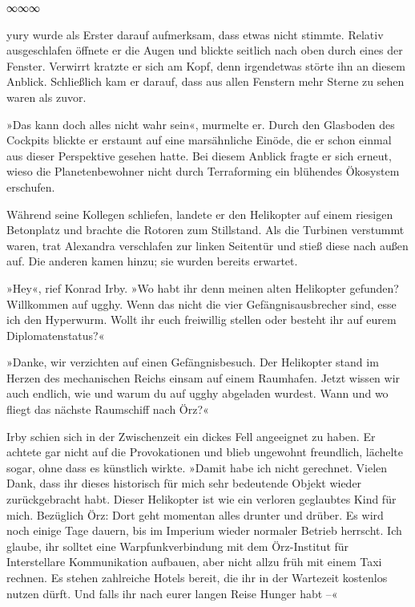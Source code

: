 \begin{center}
∞∞∞
\end{center}

yury wurde als Erster darauf aufmerksam, dass etwas nicht stimmte. Relativ ausgeschlafen öffnete er die Augen und blickte seitlich nach oben durch eines der Fenster. Verwirrt kratzte er sich am Kopf, denn irgendetwas störte ihn an diesem Anblick. Schließlich kam er darauf, dass aus allen Fenstern mehr Sterne zu sehen waren als zuvor.

»Das kann doch alles nicht wahr sein«, murmelte er. Durch den Glasboden des Cockpits blickte er erstaunt auf eine marsähnliche Einöde, die er schon einmal aus dieser Perspektive gesehen hatte. Bei diesem Anblick fragte er sich erneut, wieso die Planetenbewohner nicht durch Terraforming ein blühendes Ökosystem erschufen.

Während seine Kollegen schliefen, landete er den Helikopter auf einem riesigen Betonplatz und brachte die Rotoren zum Stillstand. Als die Turbinen verstummt waren, trat Alexandra verschlafen zur linken Seitentür und stieß diese nach außen auf. Die anderen kamen hinzu; sie wurden bereits erwartet.

»Hey«, rief Konrad Irby. »Wo habt ihr denn meinen alten Helikopter gefunden? Willkommen auf ugghy. Wenn das nicht die vier Gefängnisausbrecher sind, esse ich den Hyperwurm. Wollt ihr euch freiwillig stellen oder besteht ihr auf eurem Diplomatenstatus?«

»Danke, wir verzichten auf einen Gefängnisbesuch. Der Helikopter stand im Herzen des mechanischen Reichs einsam auf einem Raumhafen. Jetzt wissen wir auch endlich, wie und warum du auf ugghy abgeladen wurdest. Wann und wo fliegt das nächste Raumschiff nach Örz?«

Irby schien sich in der Zwischenzeit ein dickes Fell angeeignet zu haben. Er achtete gar nicht auf die Provokationen und blieb ungewohnt freundlich, lächelte sogar, ohne dass es künstlich wirkte. »Damit habe ich nicht gerechnet. Vielen Dank, dass ihr dieses historisch für mich sehr bedeutende Objekt wieder zurückgebracht habt. Dieser Helikopter ist wie ein verloren geglaubtes Kind für mich. Bezüglich Örz: Dort geht momentan alles drunter und drüber. Es wird noch einige Tage dauern, bis im Imperium wieder normaler Betrieb herrscht. Ich glaube, ihr solltet eine Warpfunkverbindung mit dem Örz-Institut für Interstellare Kommunikation aufbauen, aber nicht allzu früh mit einem Taxi rechnen. Es stehen zahlreiche Hotels bereit, die ihr in der Wartezeit kostenlos nutzen dürft. Und falls ihr nach eurer langen Reise Hunger habt –«

